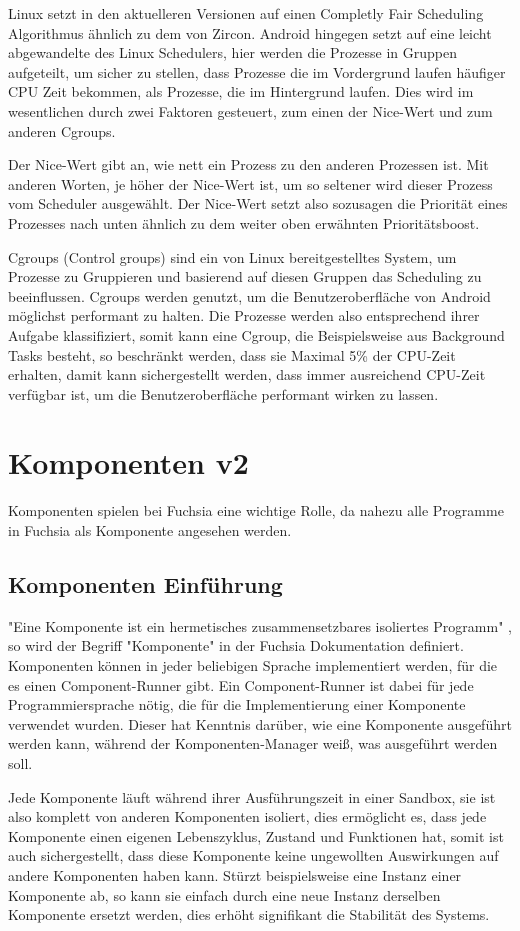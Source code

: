 \documentclass[a4paper]{scrartcl}
\begin{document}
Linux setzt in den aktuelleren Versionen auf einen Completly Fair Scheduling Algorithmus ähnlich zu dem von Zircon. Android hingegen setzt auf eine leicht abgewandelte des Linux Schedulers, hier werden die Prozesse in Gruppen aufgeteilt, um sicher zu stellen, dass Prozesse die im Vordergrund laufen häufiger CPU Zeit bekommen, als Prozesse, die im Hintergrund laufen. Dies wird im wesentlichen durch zwei Faktoren gesteuert, zum einen der Nice-Wert und zum anderen Cgroups.

Der Nice-Wert gibt an, wie nett ein Prozess zu den anderen Prozessen ist. Mit anderen Worten, je höher der Nice-Wert ist, um so seltener wird dieser Prozess vom Scheduler ausgewählt. Der Nice-Wert setzt also sozusagen die Priorität eines Prozesses nach unten ähnlich zu dem weiter oben erwähnten Prioritätsboost.

Cgroups (Control groups) sind ein von Linux bereitgestelltes System, um Prozesse zu Gruppieren und basierend auf diesen Gruppen das Scheduling zu beeinflussen. Cgroups werden genutzt, um die Benutzeroberfläche von Android möglichst performant zu halten. Die Prozesse werden also entsprechend ihrer Aufgabe klassifiziert, somit kann eine Cgroup, die Beispielsweise aus Background Tasks besteht, so beschränkt werden, dass sie Maximal 5\% der CPU-Zeit erhalten, damit kann sichergestellt werden, dass immer ausreichend CPU-Zeit verfügbar ist, um die Benutzeroberfläche performant wirken zu lassen.
\section{Komponenten v2}
Komponenten spielen bei Fuchsia eine wichtige Rolle, da nahezu alle Programme in Fuchsia als Komponente angesehen werden.
\subsection{Komponenten Einführung}
\label{sec:Components}
"Eine Komponente ist ein hermetisches zusammensetzbares isoliertes Programm" \cite{FuCHSIADOCS}, so wird der Begriff "Komponente" in der Fuchsia Dokumentation definiert. Komponenten können in jeder beliebigen Sprache implementiert werden, für die es einen Component-Runner gibt. Ein Component-Runner ist dabei für jede Programmiersprache nötig, die für die Implementierung einer Komponente verwendet wurden. Dieser hat Kenntnis darüber, wie eine Komponente ausgeführt werden kann, während der Komponenten-Manager weiß, was ausgeführt werden soll.

Jede Komponente läuft während ihrer Ausführungszeit in einer Sandbox, sie ist also komplett von anderen Komponenten isoliert, dies ermöglicht es, dass jede Komponente einen eigenen Lebenszyklus, Zustand und Funktionen hat, somit ist auch sichergestellt, dass diese Komponente keine ungewollten Auswirkungen auf andere Komponenten haben kann. Stürzt beispielsweise eine Instanz einer Komponente ab, so kann sie einfach durch eine neue Instanz derselben Komponente ersetzt werden, dies erhöht signifikant die Stabilität des Systems.
\end{document}
